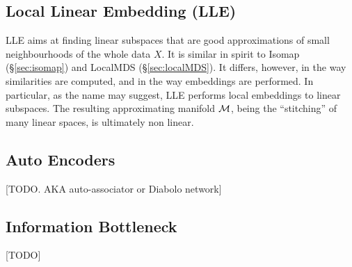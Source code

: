 \subsection{Local Linear Embedding (LLE)}
\label{sec:lle}


LLE aims at finding linear subspaces that are good approximations of small neighbourhoods of the whole data $X$.
It is similar in spirit to Isomap (\S\ref{sec:isomap}) and LocalMDS (\S\ref{sec:localMDS}).
It differs, however, in the way similarities are computed, and in the way embeddings are performed. 
In particular, as the name may suggest, LLE performs local embeddings to linear subspaces. The resulting approximating manifold $\mathcal{M}$, being the ``stitching'' of many linear spaces, is ultimately non linear.




\subsection{Auto Encoders}
\label{sec:auto_encoders}
[TODO. AKA auto-associator or Diabolo network]



\subsection{Information Bottleneck}
[TODO]

%
%
%


